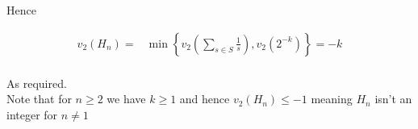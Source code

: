 Hence

\begin{equation*}
\begin{aligned}
	v_2(H_n) =& \min\left\{ v_2\left(\sum_{s\in S}\frac{1}{s}\right) , v_2(2^{-k})\right\} = -k\\
\end{aligned}
\end{equation*}

As required.
\\

Note that for $n \geq 2$ we have $k \geq 1$ and hence $v_2(H_n) \leq -1$ meaning $H_n$ isn't an integer for $n\neq1$
%
%
%
%
%
%
%
